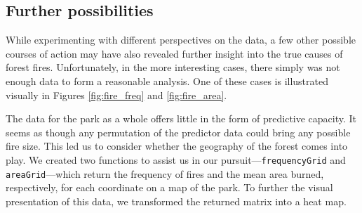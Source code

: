 \documentclass{article}
\begin{document}
\subsection{Further possibilities}

While experimenting with different perspectives on the data, a few other possible
courses of action may have also revealed further insight into the true causes
of forest fires. Unfortunately, in the more interesting cases, there simply was
not enough data to form a reasonable analysis. One of these cases is
illustrated visually in Figures \ref{fig:fire_freq} and \ref{fig:fire_area}.

The data for the park as a whole offers little in the form of predictive
capacity. It seems as though any permutation of the predictor data could bring
any possible fire size. This led us to consider whether the geography of the
forest comes into play.  We created two functions to assist us in our
pursuit---\verb+frequencyGrid+ and \verb+areaGrid+---which return the frequency
of fires and the mean area burned, respectively, for each coordinate on a map
of the park. To further the visual presentation of this data, we transformed
the returned matrix into a heat map.
\end{document}

